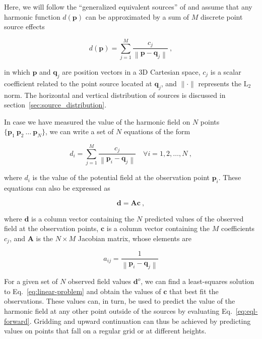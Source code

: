 Here, we will follow the ``generalized equivalent sources'' of
\citet{cordell1992} and assume that any harmonic function $d(\mathbf{p})$ can
be approximated by a sum of $M$ discrete point source effects

\begin{equation}
    d(\mathbf{p})
    =
    \sum\limits_{j=1}^{M} \frac{c_j}{\left\lVert \mathbf{p} - \mathbf{q}_j
    \right\rVert} \ ,
    \label{eq:eql-forward}
\end{equation}

\noindent in which
$\mathbf{p}$ and $\mathbf{q}_j$ are position vectors in a 3D Cartesian space,
$c_j$ is a scalar coefficient related to the point source located at
$\mathbf{q}_j$,
and $\lVert \cdot \rVert$ represents the $\text{L}_2$ norm.
The horizontal and vertical distribution of sources is discussed in section~\ref{sec:source_distribution}.

In case we have measured the value of the harmonic field on $N$ points
$\{\mathbf{p}_1\ \mathbf{p}_2\ \ldots\ \mathbf{p}_N\}$,
we can write a set of $N$ equations of the form

\begin{equation}
    d_i
    =
    \sum\limits_{j=1}^{M} \frac{c_j}{\left\lVert \mathbf{p}_i - \mathbf{q}_j
    \right\rVert}
    \quad \forall i=1,2,\ldots,N
    \ ,
    \label{eq:forward-sum}
\end{equation}

\noindent where $d_i$ is the value of the potential field at the observation point $\mathbf{p}_i$.
These equations can also be expressed as

\begin{equation}
    \mathbf{d} = \mathbf{A} \mathbf{c} \ ,
    \label{eq:linear-problem}
\end{equation}

\noindent where $\mathbf{d}$ is a column vector containing the $N$ predicted
values of the observed field at the observation points,
$\mathbf{c}$ is a column vector containing the $M$ coefficients $c_j$,
and $\mathbf{A}$ is the $N \times M$ Jacobian matrix,
whose elements are

\begin{equation}
    a_{ij} = \frac{1}{\left\lVert\mathbf{p}_i - \mathbf{q}_j\right\rVert}
\end{equation}

For a given set of $N$ observed field values $\mathbf{d}^o$,
we can find a least-squares solution to
Eq.~\ref{eq:linear-problem} and obtain the values of
$\mathbf{c}$ that best fit the observations.
These values can, in turn, be used to predict the value of the harmonic field
at any other point outside of the sources by evaluating
Eq.~\ref{eq:eql-forward}.
Gridding and upward continuation can thus be achieved by predicting values on
points that fall on a regular grid or at different heights.


